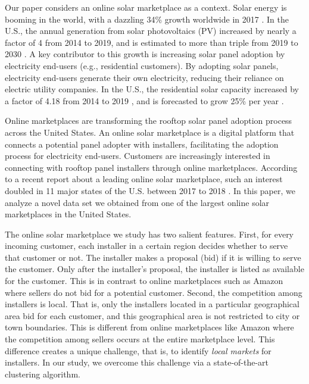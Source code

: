 \documentclass[mnsc,blindrev]{informs3}
\begin{document}
	
	Our paper considers an online solar marketplace as a context. Solar energy is booming in the world, with a dazzling 34\% growth worldwide in 2017 \citep{iea2018snapshot}. In the U.S., the annual generation from solar photovoltaics (PV) increased by nearly a factor of 4 from 2014 to 2019, and is estimated to more than triple from 2019 to 2030 \citep{USEIA-I,USEIA-II}. A key contributor to this growth is increasing solar panel adoption by electricity end-users (e.g., residential customers). By adopting solar panels, electricity end-users generate their own electricity, reducing their reliance on electric utility companies. In the U.S., the residential solar capacity increased by a factor of 4.18 from 2014 to 2019 \citep{USEIA-III}, and is forecasted to grow 25\% per year \citep{weaver_2019,seia,gtmsolar2018}.
	
	Online marketplaces are transforming the rooftop solar panel adoption process across the United States. An online solar marketplace is a digital platform that connects a potential panel adopter with installers, facilitating the adoption process for electricity end-users. Customers are increasingly interested in connecting with rooftop panel installers through online marketplaces. According to a recent report about a leading online solar marketplace, such an interest doubled in 11 major states of the U.S. between 2017 to 2018 \citep{energysageintel19}.  In this paper, we analyze a novel data set we obtained from one of the largest online solar marketplaces in the United States.
	
	
	The online solar marketplace we study has two salient features. First, for every incoming customer, each installer in a certain region decides whether to serve that customer or not. The installer makes a proposal (bid) if it is willing to serve the customer. Only after the installer's proposal, the installer is listed as available for the customer. This is in contrast to online marketplaces such as Amazon where sellers do not bid for a potential customer. Second, the competition among installers is local. That is, only the installers located in a particular geographical area bid for each customer, and this geographical area is not restricted to city or town boundaries. This is different from online marketplaces like Amazon where the competition among sellers occurs at the entire marketplace level. This difference creates a unique challenge, that is, to identify \emph{local markets} for installers. In our study, we overcome this challenge via a state-of-the-art clustering algorithm.
	
\end{document}
